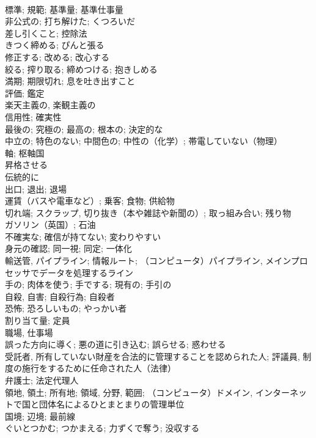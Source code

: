 \documentclass[8pt]{extreport}
\begin{document}
\begin{CJK}{UTF8}{min}
\\	標準; 規範; 基準量; 基準仕事量	
\\	非公式の; 打ち解けた; くつろいだ	
\\	差し引くこと; 控除法	
\\	きつく締める; ぴんと張る	
\\	修正する; 改める; 改心する	
\\	絞る; 搾り取る; 締めつける; 抱きしめる	
\\	満期; 期限切れ; 息を吐き出すこと	
\\	評価; 鑑定	
\\	楽天主義の, 楽観主義の	
\\	信用性; 確実性	
\\	最後の; 究極の; 最高の; 根本の; 決定的な	
\\	中立の; 特色のない; 中間色の; 中性の（化学）; 帯電していない（物理）	
\\	軸; 枢軸国	
\\	昇格させる	
\\	伝統的に	
\\	出口; 退出; 退場	
\\	運賃（バスや電車など）; 乗客; 食物; 供給物	
\\	切れ端; スクラップ, 切り抜き（本や雑誌や新聞の）; 取っ組み合い; 残り物	
\\	ガソリン（英国）; 石油	
\\	不確実な; 確信が持てない; 変わりやすい	
\\	身元の確認; 同一視; 同定; 一体化	
\\	輸送管, パイプライン; 情報ルート; （コンピュータ）パイプライン, メインプロセッサでデータを処理するライン	
\\	手の; 肉体を使う; 手でする; 現有の; 手引の	
\\	自殺, 自害; 自殺行為; 自殺者	
\\	恐怖; 恐ろしいもの; やっかい者	
\\	割り当て量; 定員	
\\	職場, 仕事場	
\\	誤った方向に導く; 悪の道に引き込む; 誤らせる; 惑わせる	
\\	受託者, 所有していない財産を合法的に管理することを認められた人; 評議員, 制度の施行をするために任命された人（法律）	
\\	弁護士; 法定代理人	
\\	領地, 領土; 所有地; 領域, 分野, 範囲; （コンピュータ）ドメイン, インターネットで国と団体名によるひとまとまりの管理単位	
\\	国境; 辺境; 最前線	
\\	ぐいとつかむ; つかまえる; 力ずくで奪う; 没収する	

\end{CJK}
\end{document}
